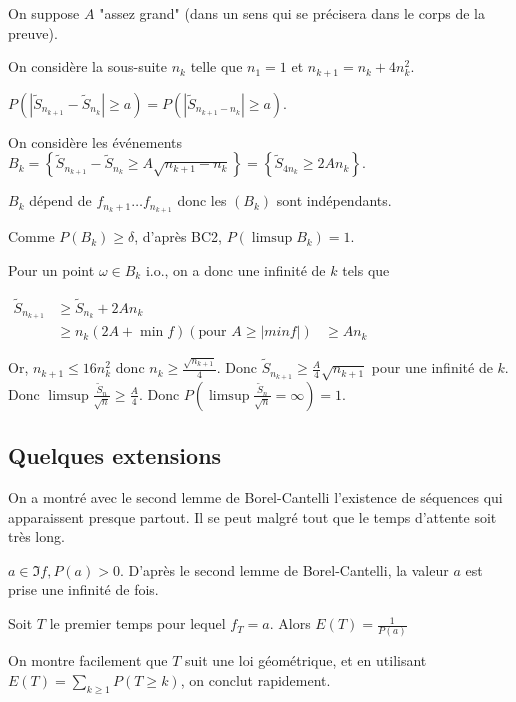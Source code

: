 \documentclass[10pt,a4paper,notitlepage ]{report}
\begin{document}
\begin{demo}[Théorème 14]
	On suppose $A$ "assez grand" (dans un sens qui se précisera dans le corps de la preuve).
	
	On considère la sous-suite $n_k$ telle que $n_1=1$ et $n_{k+1}=n_k+4n_k^2$.
	
	$P\left( \left|\tilde S_{n_{k+1}} - \tilde S_{n_k} \right| \ge a \right) = P\left( \left|\tilde S_{n_{k+1} - n_k} \right| \ge a\right)$.
	
	On considère les événements $B_k = \left\{ \tilde S_{n_{k+1}} - \tilde S_{n_k} \ge A\sqrt{n_{k+1} - n_k} \right\} = \left\{ \tilde S_{4n_k} \ge 2An_k \right\}$.
	
	$B_k$ dépend de $f_{n_k+1} \dots f_{n_{k+1}}$ donc les $(B_k)$ sont indépendants.
	
	Comme $P(B_k) \ge \delta$, d'après BC2, $P(\limsup B_k) = 1$.
	
	Pour un point $\omega \in B_k \text{ i.o.}$, on a donc une infinité de $k$ tels que
	
	$\begin{aligned}
		\tilde S_{n_{k+1}} &\ge \tilde S_{n_k} +2An_k \\
		&\ge n_k(2A+\min f)
		(\text{pour } A \ge |min f|) &\ge An_k
		\end{aligned}$
	
	Or, $n_{k+1} \le 16n_k^2$ donc $n_k \ge \frac {\sqrt{n_{k+1}}} 4$. Donc $\tilde S_{n_{k+1}} \ge \frac A 4 \sqrt{n_{k+1}}$ pour une infinité de $k$. Donc $\limsup \frac {\tilde S_n} {\sqrt n} \ge \frac A 4$. Donc $P(\limsup \frac{\tilde S_n}{\sqrt n} = \infty) = 1$.
\end{demo}

\subsection{Quelques extensions}

On a montré avec le second lemme de Borel-Cantelli l'existence de séquences qui apparaissent presque partout. Il se peut malgré tout que le temps d'attente soit très long.

\begin{lemme}
	$a\in \Im f, P(a) > 0$. D'après le second lemme de Borel-Cantelli, la valeur $a$ est prise une infinité de fois.
	
	Soit $T$ le premier temps pour lequel $f_T=a$. Alors $E(T) = \frac 1 {P(a)}$
\end{lemme}

\begin{demo}
	On montre facilement que $T$ suit une loi géométrique, et en utilisant $E(T) = \underset{k\ge 1} \sum P(T\ge k)$, on conclut rapidement.
\end{demo}
\end{document}

